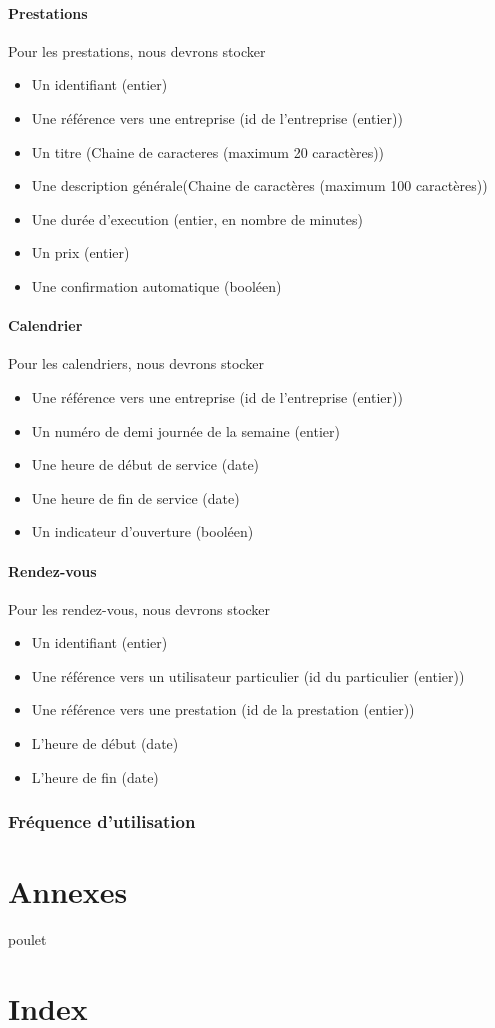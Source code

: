 \documentclass{article}
\begin{document}
\paragraph{Prestations}
Pour les prestations, nous devrons stocker
\begin{itemize}
\item Un identifiant (entier)
\item Une référence vers une entreprise (id de l'entreprise (entier))
\item Un titre (Chaine de caracteres (maximum 20 caractères))
\item Une description générale(Chaine de caractères (maximum 100 caractères))
\item Une durée d'execution (entier, en nombre de minutes)
\item Un prix (entier)
\item Une confirmation automatique (booléen)
\end{itemize}

\paragraph{Calendrier}
Pour les calendriers, nous devrons stocker
\begin{itemize}
\item Une référence vers une entreprise (id de l'entreprise (entier))
\item Un numéro de demi journée de la semaine (entier)
\item Une heure de début de service (date)
\item Une heure de fin de service (date)
\item Un indicateur d'ouverture (booléen)
\end{itemize}

\paragraph{Rendez-vous}
Pour les rendez-vous, nous devrons stocker
\begin{itemize}
\item Un identifiant (entier)
\item Une référence vers un utilisateur particulier (id du particulier (entier))
\item Une référence vers une prestation (id de la prestation (entier))
\item L'heure de début (date)
\item L'heure de fin (date)
\end{itemize}

\subsubsection{Fréquence d'utilisation}


\section{Annexes}
poulet
\section{Index}
\end{document}
